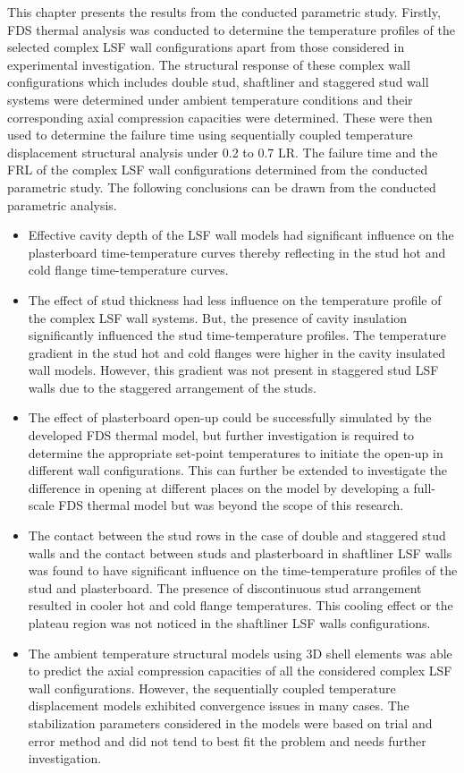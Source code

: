 This chapter presents the results from the conducted parametric study. Firstly, FDS thermal analysis was conducted to determine the temperature profiles of the selected complex LSF  wall configurations apart from those considered in experimental investigation. The structural response of these complex wall configurations which includes double stud, shaftliner and staggered stud wall systems were determined under ambient temperature conditions and their corresponding axial compression capacities were determined. These were then used to determine the failure time using sequentially coupled temperature displacement structural analysis under 0.2 to 0.7 LR. The failure time and the FRL of the complex LSF wall configurations determined from the conducted parametric study. The following conclusions can be drawn from the conducted parametric analysis.
\begin{itemize}
	\item Effective cavity depth of the LSF wall models had significant influence on the plasterboard time-temperature curves thereby reflecting in the stud hot and cold flange time-temperature curves.
	\item The effect of stud thickness had less influence on the temperature profile of the complex LSF wall systems. But, the presence of cavity insulation significantly influenced the stud time-temperature profiles. The temperature gradient in the stud hot and cold flanges were higher in the cavity insulated wall models. However, this gradient was not present in staggered stud LSF walls due to the staggered arrangement of the studs.
	\item The effect of plasterboard open-up could be successfully simulated by the developed FDS thermal model, but further investigation is required to determine the appropriate set-point temperatures to initiate the open-up in different wall configurations. This can further be extended to investigate the difference in opening at different places on the model by developing a full-scale FDS thermal model but was beyond the scope of this research. 
	\item The contact between the stud rows in the case of double and staggered stud walls and the contact between studs and plasterboard in shaftliner LSF walls was found to have significant influence on the time-temperature profiles of the stud and plasterboard. The presence of discontinuous stud arrangement resulted in cooler hot and cold flange temperatures. This cooling effect or the plateau region was not noticed in the shaftliner LSF walls configurations.
	\item The ambient temperature structural models using 3D shell elements was able to predict the axial compression capacities of all the considered complex LSF wall configurations. However, the sequentially coupled temperature displacement models exhibited convergence issues in many cases. The stabilization parameters considered in the models were based on trial and error method and did not tend to best fit the problem and needs further investigation. 
\end{itemize}

